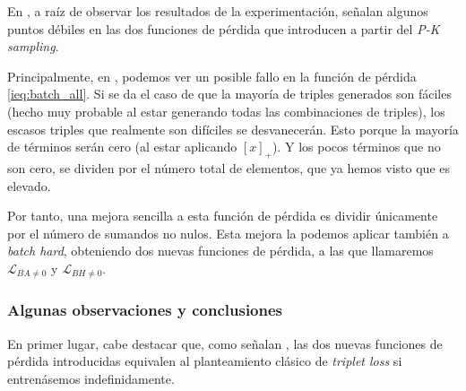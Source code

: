 En \cite{informatica:principal}, a raíz de observar los resultados de la experimentación, señalan algunos puntos débiles en las dos funciones de pérdida que introducen a partir del \textit{P-K sampling}.

Principalmente, en , podemos ver un posible fallo en la función de pérdida \eqref{ieq:batch_all}. Si se da el caso de que la mayoría de triples generados son fáciles (hecho muy probable al estar generando todas las combinaciones de triples), los escasos triples que realmente son difíciles se desvanecerán. Esto porque la mayoría de términos serán cero (al estar aplicando $[x]_+$). Y los pocos términos que no son cero, se dividen por el número total de elementos, que ya hemos visto que es elevado.

Por tanto, una mejora sencilla a esta función de pérdida es dividir únicamente por el número de sumandos no nulos. Esta mejora la podemos aplicar también a \textit{batch hard}, obteniendo dos nuevas funciones de pérdida, a las que llamaremos $\mathcal{L}_{BA \neq 0}$ y $\mathcal{L}_{BH \neq 0}$.

\subsubsection{Algunas observaciones y conclusiones}

En primer lugar, cabe destacar que, como señalan \cite{informatica:principal}, las dos nuevas funciones de pérdida introducidas equivalen al planteamiento clásico de \textit{triplet loss} si entrenásemos indefinidamente.


